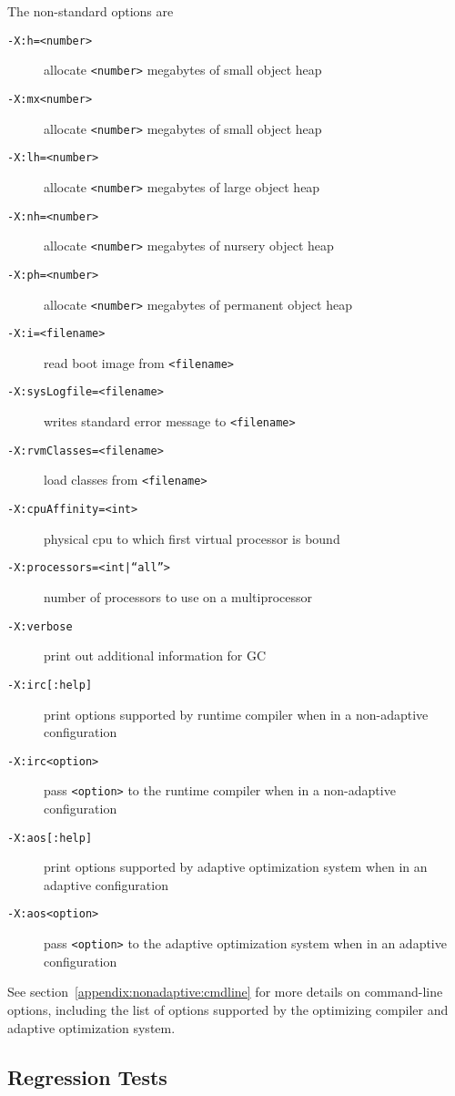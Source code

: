 The non-standard options are

\begin{description}
\item[{\tt -X:h=<number>}]
allocate {\tt <number>} megabytes of small object heap

\item[{\tt -X:mx<number>}]
allocate {\tt <number>} megabytes of small object heap

\item[{\tt -X:lh=<number>}]
allocate {\tt <number>} megabytes of large object heap

\item[{\tt -X:nh=<number>}]
allocate {\tt <number>} megabytes of nursery object heap 

\item[{\tt -X:ph=<number>}]
allocate {\tt <number>} megabytes of permanent object heap 

\item[{\tt -X:i=<filename>}]
read boot image from {\tt <filename>}

\item[{\tt -X:sysLogfile=<filename>}]
writes standard error message to {\tt <filename>}

\item[{\tt -X:rvmClasses=<filename>}]
load classes from {\tt <filename>}

\item[{\tt -X:cpuAffinity=<int>}]
physical cpu to which first virtual processor is bound

\item[{\tt -X:processors=<int|``all''>}]
number of processors to use on a multiprocessor

\item[{\tt -X:verbose}]
print out additional information for GC

\item[{\tt -X:irc[:help]}]
print options supported by runtime compiler when in a non-adaptive configuration 

\item[{\tt -X:irc<option>}]
pass {\tt <option>} to the runtime compiler when in a non-adaptive configuration 

\item[{\tt -X:aos[:help]}]
print options supported by adaptive optimization system when in an
adaptive configuration

\item[{\tt -X:aos<option>}]
pass {\tt <option>} to the adaptive optimization system when in an adaptive configuration

\end{description}

See section~\ref{appendix:nonadaptive:cmdline} for more details on 
command-line options, including the list of options supported by the 
optimizing compiler and adaptive optimization system.

\JikesTMFooter

\JavaTMFooter

\subsection{Regression Tests}

